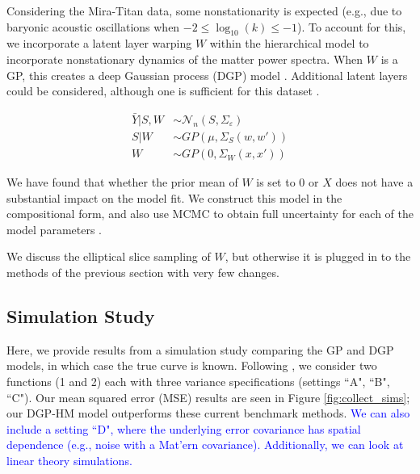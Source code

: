 \documentclass[11pt]{article}
\begin{document}
Considering the Mira-Titan data, some nonstationarity is expected (e.g., due to baryonic acoustic oscillations when $-2 \leq \log_{10}(k) \leq -1$). To account for this, we incorporate a latent layer warping $W$ within the hierarchical model to incorporate nonstationary dynamics of the matter power spectra. When $W$ is a GP, this creates a deep Gaussian process (DGP) model \citep{damianou2013deep}. Additional latent layers could be considered, although one is sufficient for this dataset \citep{dunlop2018deep}.

$$
\begin{aligned}
\bar Y|S,W &\sim \mathcal{N}_n(S,\Sigma_\varepsilon) \\
S|W &\sim GP\left(\mu, \Sigma_S(w,w')\right) \\
W &\sim GP\left(0, \Sigma_W(x,x')\right)
\end{aligned}
$$

We have found that whether the prior mean of $W$ is set to 0 or $X$ \citep[which would indicate stationarity apriori, ][]{schmidt2003bayesian} does not have a substantial impact on the model fit. We construct this model in the compositional form, and also use MCMC to obtain full uncertainty for each of the model parameters \citep{sauer2023active}.

We discuss the elliptical slice sampling of $W$, but otherwise it is plugged in to the methods of the previous section with very few changes.

\subsection{Simulation Study}
\label{subsec:sim}

Here, we provide results from a simulation study comparing the GP and DGP models, in which case the true curve is known. Following \cite{moran2024dpc}, we consider two functions (1 and 2) each with three variance specifications (settings ``A", ``B", ``C"). Our mean squared error (MSE) results are seen in Figure \ref{fig:collect_sims}; our DGP-HM model outperforms these current benchmark methods. \textcolor{blue}{We can also include a setting ``D", where the underlying error covariance has spatial dependence (e.g., noise with a Mat'ern covariance). Additionally, we can look at linear theory simulations.}
\end{document}
